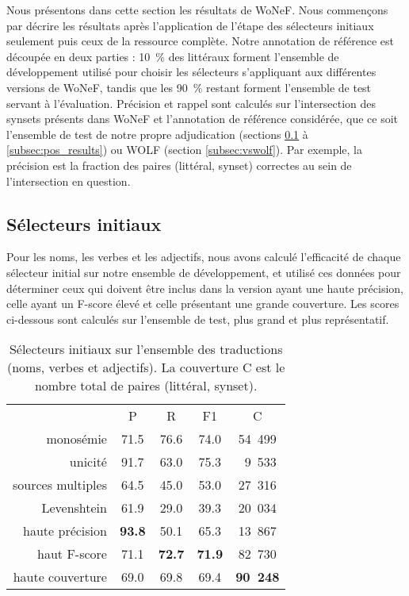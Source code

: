 Nous présentons dans cette section les résultats de WoNeF. Nous commençons par
décrire les résultats après l'application de l'étape des sélecteurs initiaux
seulement puis ceux de la ressource complète. Notre annotation de référence est
découpée en deux parties : 10~\% des littéraux forment l'ensemble de
développement utilisé pour choisir les sélecteurs s'appliquant aux différentes
versions de WoNeF, tandis que les 90~\% restant forment l'ensemble de test
servant à l'évaluation. Précision et rappel sont calculés sur l'intersection
des synsets présents dans WoNeF et l'annotation de référence considérée, que ce
soit l'ensemble de test de notre propre adjudication (sections
\ref{subsec:heuristics} à \ref{subsec:pos_results}) ou WOLF (section
\ref{subsec:vswolf}). Par exemple, la précision est la fraction des paires
(littéral, synset) correctes au sein de l'intersection en question.

\subsection{Sélecteurs initiaux}
\label{subsec:heuristics}

Pour les noms, les verbes et les adjectifs, nous avons calculé l'efficacité de
chaque sélecteur initial sur notre ensemble de développement, et utilisé ces
données pour déterminer ceux qui doivent être inclus dans la version ayant une
haute précision, celle ayant un F-score élevé et celle présentant une grande
couverture. Les scores ci-dessous sont calculés sur l'ensemble de test, plus
grand et plus représentatif.

\let\b\textbf

\begin{table}[ht]
\centering
\begin{tabular}{rcccc}
  \toprule
                    & P & R & F1 & C \\
  monosémie         & 71.5 & 76.6 & 74.0 & 54~499 \\
  unicité           & 91.7 & 63.0 & 75.3 & ~9~533 \\
  sources multiples & 64.5 & 45.0 & 53.0 & 27~316 \\
  Levenshtein       & 61.9 & 29.0 & 39.3 & 20~034 \\
  \midrule
  haute précision   & \b{93.8} & 50.1     & 65.3     & 13~867 \\
  haut F-score      & 71.1     & \b{72.7} & \b{71.9} & 82~730 \\
  haute couverture  & 69.0     & 69.8     & 69.4     & \b{90~248} \\
  \bottomrule
\end{tabular}
\caption{\protect\centering\label{table:heuristics}Sélecteurs initiaux sur l'ensemble des traductions (noms, verbes et adjectifs). La couverture C est le nombre total de paires (littéral, synset).}
\end{table}

